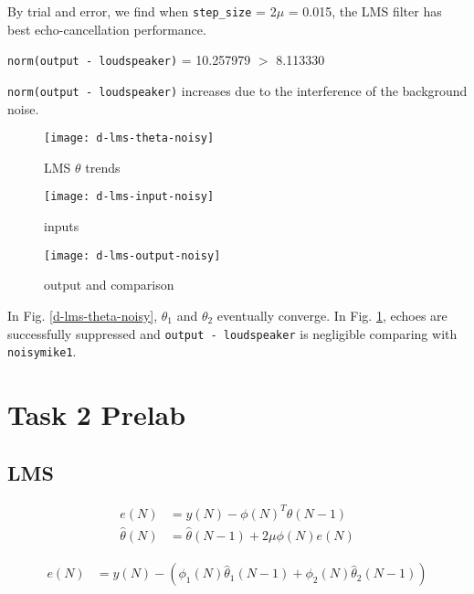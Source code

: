 \documentclass{article}
\begin{document}
By trial and error, we find when \texttt{step\_size} = 2$\mu$ = 0.015, the LMS filter has best echo-cancellation performance.
\begin{center}
\texttt{norm(output - loudspeaker)} = 10.257979 $>$ 8.113330
\end{center}
\texttt{norm(output - loudspeaker)} increases due to the interference of the background noise.

\begin{figure}[H]
\begin{minipage}[t]{0.33\linewidth}
\centering
\texttt{[image: d-lms-theta-noisy]}
\caption{LMS $\theta$ trends}
\label{d-lms-theta-noisy}
\end{minipage}
\begin{minipage}[t]{0.33\linewidth}
\centering
\texttt{[image: d-lms-input-noisy]}
\caption{inputs}
\end{minipage}
\begin{minipage}[t]{0.33\linewidth}
\centering
\texttt{[image: d-lms-output-noisy]}
\caption{output and comparison}
\label{d-lms-output-noisy}
\end{minipage}
\end{figure}

In Fig. \ref{d-lms-theta-noisy}, $\theta_1$ and $\theta_2$ eventually converge. In Fig. \ref{d-lms-output-noisy}, echoes are successfully suppressed and \texttt{output - loudspeaker} is negligible comparing with \texttt{noisymike1}.


\section*{Task 2 Prelab}

\subsection*{LMS}

\begin{align*}
e(N) &= y(N) - \phi(N)^T \hat{\theta}(N-1)\\
\hat{\theta}(N) &= \hat{\theta}(N-1) + 2 \mu \phi(N) e(N)
\end{align*}

\begin{align*}
e(N) &= y(N) - (\phi_1(N) \hat{\theta}_1(N-1) + \phi_2(N) \hat{\theta}_2(N-1))
\end{align*}
\end{document}
